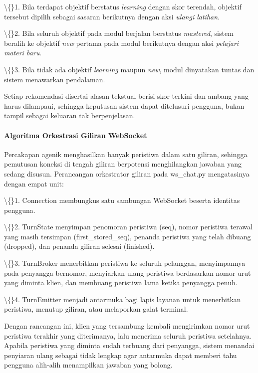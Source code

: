 \documentclass[12pt,a4paper]{article}
\begin{document}
\textbackslash\{\}1. Bila terdapat objektif berstatus \textit{learning} dengan skor terendah, objektif tersebut dipilih sebagai sasaran berikutnya dengan aksi \textit{ulangi latihan}.

\textbackslash\{\}2. Bila seluruh objektif pada modul berjalan berstatus \textit{mastered}, sistem beralih ke objektif \textit{new} pertama pada modul berikutnya dengan aksi \textit{pelajari materi baru}.

\textbackslash\{\}3. Bila tidak ada objektif \textit{learning} maupun \textit{new}, modul dinyatakan tuntas dan sistem menawarkan pendalaman.

Setiap rekomendasi disertai alasan tekstual berisi skor terkini dan ambang yang harus dilampaui, sehingga keputusan sistem dapat ditelusuri pengguna, bukan tampil sebagai keluaran tak berpenjelasan.

\paragraph*{Algoritma Orkestrasi Giliran WebSocket}
Percakapan agenik menghasilkan banyak peristiwa dalam satu giliran, sehingga pemutusan koneksi di tengah giliran berpotensi menghilangkan jawaban yang sedang disusun. Perancangan orkestrator giliran pada ws\_chat.py mengatasinya dengan empat unit:

\textbackslash\{\}1. Connection membungkus satu sambungan WebSocket beserta identitas pengguna.

\textbackslash\{\}2. TurnState menyimpan penomoran peristiwa (seq), nomor peristiwa terawal yang masih tersimpan (first\_stored\_seq), penanda peristiwa yang telah dibuang (dropped), dan penanda giliran selesai (finished).

\textbackslash\{\}3. TurnBroker menerbitkan peristiwa ke seluruh pelanggan, menyimpannya pada penyangga bernomor, menyiarkan ulang peristiwa berdasarkan nomor urut yang diminta klien, dan membuang peristiwa lama ketika penyangga penuh.

\textbackslash\{\}4. TurnEmitter menjadi antarmuka bagi lapis layanan untuk menerbitkan peristiwa, menutup giliran, atau melaporkan galat terminal.

Dengan rancangan ini, klien yang tersambung kembali mengirimkan nomor urut peristiwa terakhir yang diterimanya, lalu menerima seluruh peristiwa setelahnya. Apabila peristiwa yang diminta sudah terbuang dari penyangga, sistem menandai penyiaran ulang sebagai tidak lengkap agar antarmuka dapat memberi tahu pengguna alih-alih menampilkan jawaban yang bolong.
\end{document}
